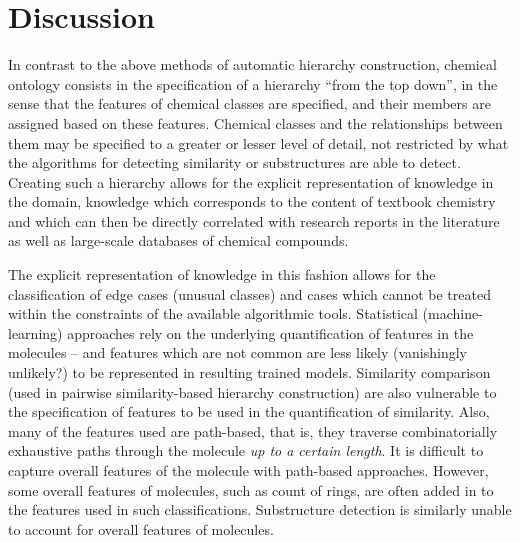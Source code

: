 \documentclass[10pt]{bmc_article}
\newenvironment{bmcformat}{\baselineskip20pt\sloppy\setboolean{publ}{false}}{\baselineskip20pt\sloppy}
\begin{document}
\begin{bmcformat}
% 



\section*{Discussion}



In contrast to the above methods of automatic hierarchy construction, chemical ontology consists in the specification of a hierarchy ``from the top down'', in the sense that the features of chemical classes are specified, and their members are assigned based on these features.  Chemical classes and the relationships between them may be specified to a greater or lesser level of detail, not restricted by what the algorithms for detecting similarity or substructures are able to detect. Creating such a hierarchy allows for the explicit representation of knowledge in the domain, knowledge which corresponds to the content of textbook chemistry and which can then be directly correlated with research reports in the literature as well as large-scale databases of chemical compounds. %

The explicit representation of knowledge in this fashion allows for the classification of edge cases (unusual classes) and cases which cannot be treated within the constraints of the available algorithmic tools. Statistical (machine-learning) approaches rely on the underlying quantification of features in the molecules -- and features which are not common are less likely (vanishingly unlikely?) to be represented in resulting trained models. Similarity comparison (used in pairwise similarity-based hierarchy construction) are also vulnerable to the specification of features to be used in the quantification of similarity. Also, many of the features used are path-based, that is, they traverse combinatorially exhaustive paths through the molecule \textit{up to a certain length}.  It is difficult to capture overall features of the molecule with path-based approaches.  However, some overall features of molecules, such as count of rings, are often added in to the features used in such classifications. Substructure detection is similarly unable to account for overall features of molecules. 


\end{bmcformat}
\end{document}
